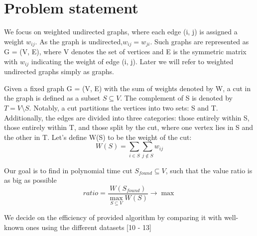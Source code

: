 \documentclass{article}
\begin{document}
\section{Problem statement}
We focus on weighted undirected graphs, where each edge (i, j) is assigned a weight $w_{ij}$. As the graph is undirected,$w_{ij} = w_{ji}$. Such graphs are represented as G = (V, E), where V denotes the set of vertices and E is the symmetric matrix with $w_{ij}$ indicating the weight of edge (i, j). Later we will refer to weighted undirected graphs simply as graphs.

Given a fixed graph G = (V, E) with the sum of weights denoted by W, a cut in the graph is defined as a subset $S \subseteq V$. The complement of S is denoted by $T = V \setminus S$. Notably, a cut partitions the vertices into two sets: S and T. Additionally, the edges are divided into three categories: those entirely within S, those entirely within T, and those split by the cut, where one vertex lies in S and the other in T. 
Let's define W(S) to be the weight of the cut: 
$$W(S) = \sum_{i \in S} \sum_{j \notin S} w_{ij}$$

Our goal is to find in polynomial time cut $S_{found} \subseteq V$, such that the value ratio is as big as possible $$ratio = \frac{W(S_{found})}{\max_{S \subseteq V}{W(S)}} \rightarrow \max$$ 

We decide on the efficiency of provided algorithm by comparing it with well-known ones using the different datasets [10 - 13]





\end{document}
